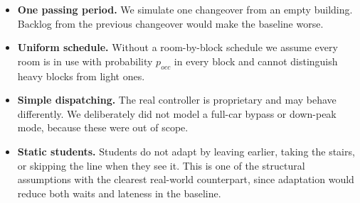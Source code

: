 \begin{itemize}
\item \textbf{One passing period.} We simulate one changeover from an empty building. Backlog from the previous
changeover would make the baseline worse.
\item \textbf{Uniform schedule.} Without a room-by-block schedule we assume every room is in use with probability
$p_{occ}$ in every block and cannot distinguish heavy blocks from light ones.
\item \textbf{Simple dispatching.} The real controller is proprietary and may behave differently. We deliberately
did not model a full-car bypass or down-peak mode, because these were out of scope.
\item \textbf{Static students.} Students do not adapt by leaving earlier, taking the stairs, or skipping the
line when they see it. This is one of the structural assumptions with the clearest real-world counterpart, since
adaptation would reduce both waits and lateness in the baseline.
\end{itemize}
